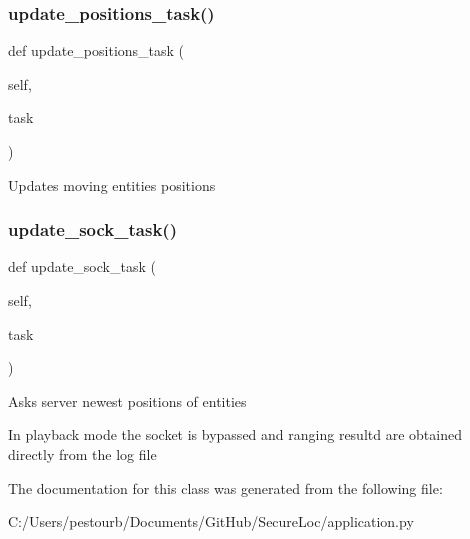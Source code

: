 \subsubsection{\texorpdfstring{update\+\_\+positions\+\_\+task()}{update\_positions\_task()}}
{\footnotesize\ttfamily def update\+\_\+positions\+\_\+task (\begin{DoxyParamCaption}\item[{}]{self,  }\item[{}]{task }\end{DoxyParamCaption})}

\begin{DoxyVerb}Updates moving entities positions\end{DoxyVerb}
 \mbox{\label{classapplication_1_1_application_aabeebafd4c55db0de5b62920f912b428}} 
\subsubsection{\texorpdfstring{update\+\_\+sock\+\_\+task()}{update\_sock\_task()}}
{\footnotesize\ttfamily def update\+\_\+sock\+\_\+task (\begin{DoxyParamCaption}\item[{}]{self,  }\item[{}]{task }\end{DoxyParamCaption})}

\begin{DoxyVerb}Asks server newest positions of entities\end{DoxyVerb}
\begin{DoxyVerb}In playback mode the socket is bypassed and ranging resultd are obtained directly from the log file\end{DoxyVerb}
 

The documentation for this class was generated from the following file\+:\begin{DoxyCompactItemize}
\item 
C\+:/\+Users/pestourb/\+Documents/\+Git\+Hub/\+Secure\+Loc/application.\+py\end{DoxyCompactItemize}
